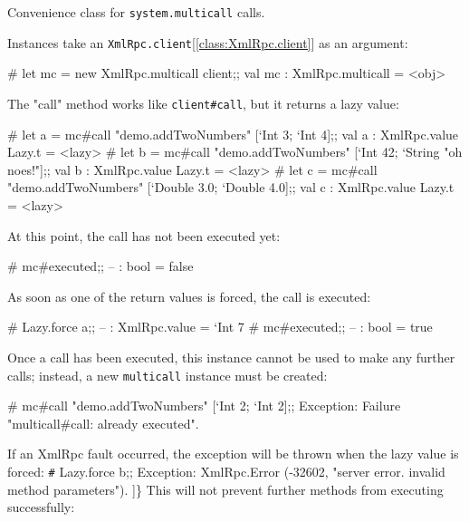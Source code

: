 \documentclass[11pt]{article}
\begin{document}
\begin{ocamldocdescription}
Convenience class for {\tt{system.multicall}} calls.


    Instances take an {\tt{XmlRpc.client}}[\ref{class:XmlRpc.client}] as an argument: \begin{ocamldoccode}

        # let mc = new XmlRpc.multicall client;;
        val mc : XmlRpc.multicall = <obj>
    
\end{ocamldoccode}

    The "call" method works like {\tt{client\verb`#`call}}, but it returns a lazy
    value: \begin{ocamldoccode}

        # let a = mc#call "demo.addTwoNumbers" [`Int 3; `Int 4];;
        val a : XmlRpc.value Lazy.t = <lazy>
        # let b = mc#call "demo.addTwoNumbers" [`Int 42; `String "oh noes!"];;
        val b : XmlRpc.value Lazy.t = <lazy>
        # let c = mc#call "demo.addTwoNumbers" [`Double 3.0; `Double 4.0];;
        val c : XmlRpc.value Lazy.t = <lazy>
    
\end{ocamldoccode}

    At this point, the call has not been executed yet: \begin{ocamldoccode}

        # mc#executed;;
        -- : bool = false
    
\end{ocamldoccode}

    As soon as one of the return values is forced, the call is executed: \begin{ocamldoccode}

        # Lazy.force a;;
        -- : XmlRpc.value = `Int 7
        # mc#executed;;
        -- : bool = true
    
\end{ocamldoccode}

    Once a call has been executed, this instance cannot be used to make any
    further calls; instead, a new {\tt{multicall}} instance must be created: \begin{ocamldoccode}

        # mc#call "demo.addTwoNumbers" [`Int 2; `Int 2];;
        Exception: Failure "multicall#call: already executed".
    
\end{ocamldoccode}

    If an XmlRpc fault occurred, the exception will be thrown when the lazy
    value is forced:
        \verb`#` Lazy.force b;;
        Exception: XmlRpc.Error (-32602, "server error. invalid method parameters").
    ]\}
    This will not prevent further methods from executing successfully: \begin{ocamldoccode}


\end{ocamldoccode}
\end{ocamldocdescription}
\end{document}
